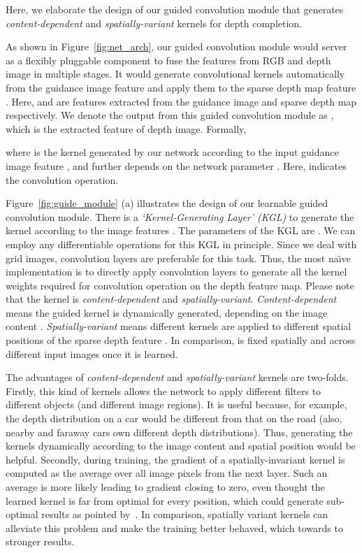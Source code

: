 \documentclass[journal]{IEEEtran}
\begin{document}
Here, we elaborate the design of our guided convolution module that generates \emph{content-dependent} and \emph{spatially-variant} kernels for depth completion.

As shown in Figure~\ref{fig:net_arch},
our guided convolution module would server as a flexibly pluggable component to fuse the features from RGB and depth image in multiple stages.
It would generate convolutional kernels automatically from the guidance image feature  and apply them to the sparse depth map feature .
Here,  and  are features extracted from the guidance image  and sparse depth map  respectively.
We denote the output from this guided convolution module as , which is the extracted feature of depth image. Formally, 

where  is the kernel generated by our network according to the input guidance image feature , and further depends on the network parameter .
Here,  indicates the convolution operation. 

Figure~\ref{fig:guide_module} (a) illustrates the design of our learnable guided convolution module.
There is a \emph{`Kernel-Generating Layer' (KGL)} to generate the kernel  according to the image features .
The parameters of the KGL are .
We can employ any differentiable operations for this KGL in principle.
Since we deal with grid images, convolution layers are preferable for this task.
Thus, the most na\"{\i}ve implementation is to directly apply convolution layers to generate all the kernel weights required for convolution operation on the depth feature map.
Please note that the kernel  is  \emph{content-dependent} and \emph{spatially-variant}.
\emph{Content-dependent} means the guided kernel  is dynamically generated, depending on the image content .
\emph{Spatially-variant} means different kernels are applied to different spatial positions of the sparse depth feature .
In comparison,  is fixed spatially and across different input images once it is learned.



The advantages of \emph{content-dependent} and \emph{spatially-variant} kernels are two-folds.
Firstly, this kind of kernels allows the network to apply different filters to different objects (and different image regions).
It is useful because, for example, the depth distribution on a car would be different from that on the road (also, nearby and faraway cars own different depth distributions).
Thus, generating the kernels dynamically according to the image content and spatial position would be helpful. 
Secondly, during training, the gradient of a spatially-invariant kernel is computed as the average over all image pixels from the next layer.
Such an average is more likely leading to gradient closing to zero, even thought the learned kernel is far from optimal for every position,
which could generate sub-optimal results as pointed by~\cite{large_dynamic_filter}.
In comparison, spatially variant kernels can alleviate this problem and make the training better behaved, which towards to stronger results. 
\end{document}
